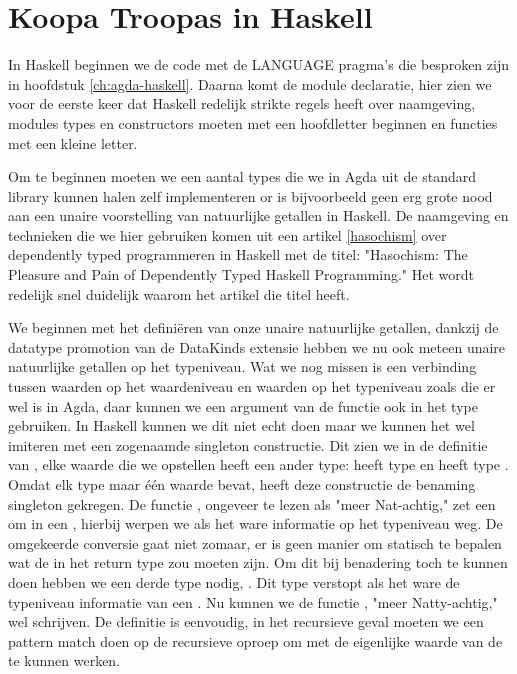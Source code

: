 \section{Koopa Troopas in Haskell}

In Haskell beginnen we de code met de LANGUAGE pragma's die besproken zijn in
hoofdstuk \ref{ch:agda-haskell}. Daarna komt de module declaratie, hier zien we
voor de eerste keer dat Haskell redelijk strikte regels heeft over naamgeving,
modules types en constructors moeten met een hoofdletter beginnen en functies
met een kleine letter.


Om te beginnen moeten we een aantal types die we in Agda uit de standard
library kunnen halen zelf implementeren or is bijvoorbeeld geen erg grote nood
aan een unaire voorstelling van natuurlijke getallen in Haskell. De naamgeving
en technieken die we hier gebruiken komen uit een artikel \ref{hasochism} over
dependently typed programmeren in Haskell met de titel: "Hasochism: The
Pleasure and Pain of Dependently Typed Haskell Programming." Het wordt redelijk
snel duidelijk waarom het artikel die titel heeft.


We beginnen met het definiëren van onze unaire natuurlijke getallen, dankzij de
datatype promotion van de DataKinds extensie hebben we nu ook meteen unaire
natuurlijke getallen op het typeniveau. Wat we nog missen is een verbinding
tussen waarden op het waardeniveau en waarden op het typeniveau zoals die er
wel is in Agda, daar kunnen we een argument van de functie ook in het type
gebruiken. In Haskell kunnen we dit niet echt doen maar we kunnen het wel
imiteren met een zogenaamde singleton constructie. Dit zien we in de definitie
van , elke waarde die we opstellen heeft een ander type:
 heeft type  en  heeft type . Omdat elk type  maar één waarde bevat, heeft deze
constructie de benaming singleton gekregen. De functie , ongeveer
te lezen als "meer Nat-achtig," zet een  om in een ,
hierbij werpen we als het ware informatie op het typeniveau weg. De omgekeerde
conversie gaat niet zomaar, er is geen manier om statisch te bepalen wat de
 in het return type  zou moeten zijn. Om dit bij
benadering toch te kunnen doen hebben we een derde type nodig, .
Dit type verstopt als het ware de typeniveau informatie van een . Nu kunnen we de functie , "meer Natty-achtig," wel
schrijven. De definitie is eenvoudig, in het recursieve geval moeten we een
pattern match doen op de recursieve oproep om met de eigenlijke waarde van de
 te kunnen werken.

